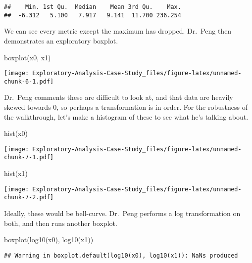 \documentclass[
]{article}
\newenvironment{Shaded}{\begin{snugshade}}{\end{snugshade}}
\newcommand{\FunctionTok}[1]{\textcolor[rgb]{0.00,0.00,0.00}{#1}}
\newcommand{\NormalTok}[1]{#1}
\begin{document}
\begin{verbatim}
##    Min. 1st Qu.  Median    Mean 3rd Qu.    Max. 
##  -6.312   5.100   7.917   9.141  11.700 236.254
\end{verbatim}

We can see every metric except the maximum has dropped. Dr.~Peng then
demonstrates an exploratory boxplot.

\begin{Shaded}
\begin{Highlighting}[]
\FunctionTok{boxplot}\NormalTok{(x0, x1)}
\end{Highlighting}
\end{Shaded}

\texttt{[image: Exploratory-Analysis-Case-Study\_files/figure-latex/unnamed-chunk-6-1.pdf]}

Dr.~Peng comments these are difficult to look at, and that data are
heavily skewed towards 0, so perhaps a transformation is in order. For
the robustness of the walkthrough, let's make a histogram of these to
see what he's talking about.

\begin{Shaded}
\begin{Highlighting}[]
\FunctionTok{hist}\NormalTok{(x0)}
\end{Highlighting}
\end{Shaded}

\texttt{[image: Exploratory-Analysis-Case-Study\_files/figure-latex/unnamed-chunk-7-1.pdf]}

\begin{Shaded}
\begin{Highlighting}[]
\FunctionTok{hist}\NormalTok{(x1)}
\end{Highlighting}
\end{Shaded}

\texttt{[image: Exploratory-Analysis-Case-Study\_files/figure-latex/unnamed-chunk-7-2.pdf]}

Ideally, these would be bell-curve. Dr.~Peng performs a log
transformation on both, and then runs another boxplot.

\begin{Shaded}
\begin{Highlighting}[]
\FunctionTok{boxplot}\NormalTok{(}\FunctionTok{log10}\NormalTok{(x0), }\FunctionTok{log10}\NormalTok{(x1))}
\end{Highlighting}
\end{Shaded}

\begin{verbatim}
## Warning in boxplot.default(log10(x0), log10(x1)): NaNs produced
\end{verbatim}
\end{document}
